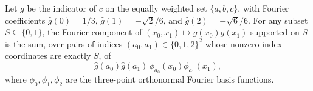 \begin{theorem}
\label{FABL.threePointBothCIndicator_orthogonalComponent_fourier}
\leanok
{}
Let $g$ be the indicator of $c$ on the equally weighted set $\{a,b,c\}$, with Fourier
coefficients $\widehat g(0)=1/3$, $\widehat g(1)=-\sqrt2/6$, and $\widehat
g(2)=-\sqrt6/6$. For any subset $S\subseteq\{0,1\}$, the Fourier component of
$(x_0,x_1)\mapsto g(x_0)g(x_1)$ supported on $S$ is the sum, over pairs of indices
$(a_0,a_1)\in\{0,1,2\}^2$ whose nonzero-index coordinates are exactly $S$, of
\[\widehat g(a_0)\widehat g(a_1)\,\phi_{a_0}(x_0)\phi_{a_1}(x_1),\]
where $\phi_0,\phi_1,\phi_2$ are the three-point orthonormal Fourier basis functions.
\end{theorem}
